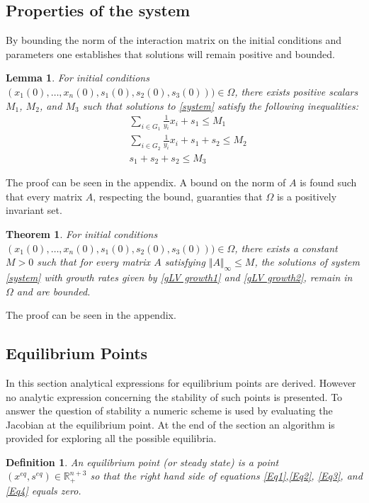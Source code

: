 \documentclass[3p,times]{elsarticle}
\newcommand{\R}{\mathbb{R}}
\newtheorem{defn}{Definition}
\newtheorem{lemma}{Lemma}
\newtheorem{theo}{Theorem}
\begin{document}
\subsection{Properties of the system}

 By bounding the norm of the interaction matrix on the initial conditions and parameters one establishes that solutions will remain positive and bounded. 

\begin{lemma}
	\label{l1}
	For initial conditions $(x_1(0),\dots,x_n(0),s_1(0),s_2(0),s_3(0)))\in \Omega$, there exists positive scalars $M_1$, $M_2$, and $M_3$ such that solutions to \eqref{system} satisfy the following inequalities:
	\begin{align}
	&\sum \limits_{i \in G_1} \frac{1}{y_i}x_i + s_1 \leq M_1 \\
	&\sum \limits_{i \in G_2} \frac{1}{y_i}x_i + s_1 +s_2 \leq M_2 \\
	&s_1 + s_2 + s_2 \leq M_3
	\end{align}
\end{lemma}

The proof can be seen in the appendix. A bound on the norm of $A$ is found such that every matrix $A$, respecting the bound, guaranties that $\Omega$ is a positively invariant set.

\begin{theo}
	\label{theoWellPosedness}
	For initial conditions $(x_1(0),\dots,x_n(0),s_1(0),s_2(0),s_3(0)))\in \Omega$, there exists a constant $M>0$ such that for every matrix $A$ satisfying $\Vert A \Vert_{\infty} \leq M $, the solutions of system \eqref{system} with growth rates given by \eqref{gLV growth1} and \eqref{gLV growth2}, remain in $\Omega$ and are bounded.
\end{theo}

The proof can be seen in the appendix.

\subsection{Equilibrium Points}

In this section analytical expressions for equilibrium points are derived. However no analytic expression concerning the stability of such points is presented. To answer the question of stability a numeric scheme is used by evaluating the Jacobian at the equilibrium point. At the end of the section an algorithm is provided for exploring all the possible equilibria.

\begin{defn} 
	An equilibrium point (or steady state) is a point $(x^{eq},s^{eq}) \in \R^{n+3}_+$ so that the right hand side of equations \eqref{Eq1},\eqref{Eq2}, \eqref{Eq3}, and \eqref{Eq4} equals zero. 
\end{defn} 
\end{document}
